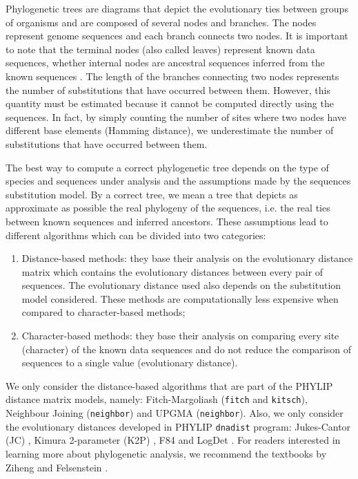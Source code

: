 Phylogenetic trees are diagrams that depict the evolutionary ties between groups of organisms \cite{M10} and are composed of several nodes and branches. The nodes represent genome sequences and each branch connects two nodes. It is important to note that the terminal nodes (also called leaves) represent known data sequences, whether internal nodes are ancestral sequences inferred from the known sequences \cite{Z06, Felsenstein2003}. The length of the branches connecting two nodes represents the number of substitutions that have occurred between them. However, this quantity must be estimated because it cannot be computed directly using the sequences. In fact, by simply counting the number of sites where two nodes have different base elements (Hamming distance), we underestimate the number of substitutions that have occurred between them. 

The best way to compute a correct phylogenetic tree depends on the type of species and sequences under analysis and the assumptions made by the sequences substitution model. By a correct tree, we mean a tree that depicts as approximate as possible the real phylogeny of the sequences, i.e. the real ties between known sequences and inferred ancestors. These assumptions lead to different algorithms which can be divided into two categories:

\begin{enumerate}
    \item Distance-based methods: they base their analysis on the evolutionary distance matrix which contains the evolutionary distances between every pair of sequences. The evolutionary distance used also depends on the substitution model considered. These methods are computationally less expensive when compared to character-based methods;
    \item Character-based methods: they base their analysis on comparing every site (character) of the known data sequences and do not reduce the comparison of sequences to a single value (evolutionary distance). 
\end{enumerate}

We only consider the distance-based algorithms that are part of the PHYLIP \cite{F89} distance matrix models, namely: Fitch-Margoliash (\texttt{fitch} and \texttt{kitsch}), Neighbour Joining  (\texttt{neighbor}) and UPGMA (\texttt{neighbor}). Also, we only consider the evolutionary distances developed in PHYLIP \texttt{dnadist} program:  Jukes-Cantor (JC) \cite{JC69}, Kimura 2-parameter (K2P) \cite{K80}, F84 \cite{F84} and LogDet \cite{L94}. For readers interested in learning more about phylogenetic analysis, we recommend the textbooks by Ziheng \cite{Z06} and Felsenstein \cite{Felsenstein2003}. %

